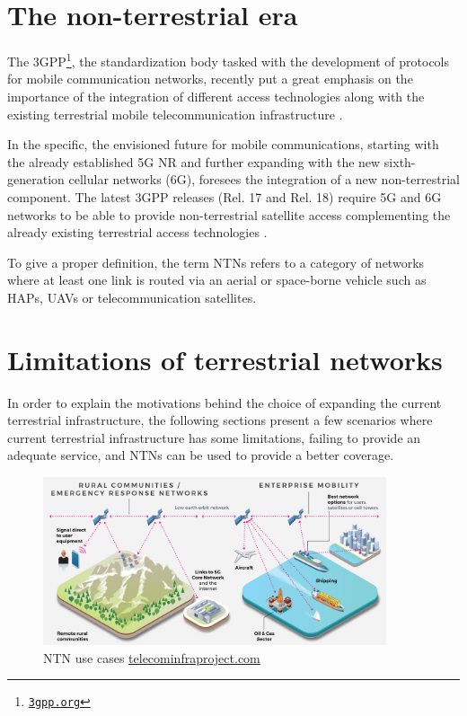 \section{The non-terrestrial era}
The \ac{3GPP}\footnote{\href{https://www.3gpp.org}{\texttt{3gpp.org}}}, the standardization body tasked with the development of protocols for mobile communication networks, recently put a great emphasis on the importance of the integration of different access technologies along with the existing terrestrial mobile telecommunication infrastructure \cite{3gpp-tr-21.917}.

In the specific, the envisioned future for mobile communications, starting with the already established 5G \ac{NR} and further expanding with the new sixth-generation cellular networks (6G), foresees the integration of a new non-terrestrial component. The latest \ac{3GPP} releases (Rel. 17 and Rel. 18) require 5G and 6G networks to be able to provide non-terrestrial satellite access complementing the already existing terrestrial access technologies \cite{overview-rel-17-18-saad} \cite{5g-nr-communication-geo-leo-maattanen}.

To give a proper definition, the term \ac{NTNs} refers to a category of networks where at least one link is routed via an aerial or space-borne vehicle such as \ac{HAPs}, \ac{UAVs} or telecommunication satellites.

\section{Limitations of terrestrial networks}
In order to explain the motivations behind the choice of expanding the current terrestrial infrastructure, the following sections present a few scenarios where current terrestrial infrastructure has some limitations, failing to provide an adequate service, and \ac{NTNs} can be used to provide a better coverage.

\begin{figure}[ht]
    \centering
    \includegraphics[width=0.9\textwidth]{res/sat-usecases.png}
    \caption{NTN use cases \href{https://telecominfraproject.com/ntcs/}{telecominfraproject.com}}
    \label{fig:sat-use-cases}
\end{figure}

